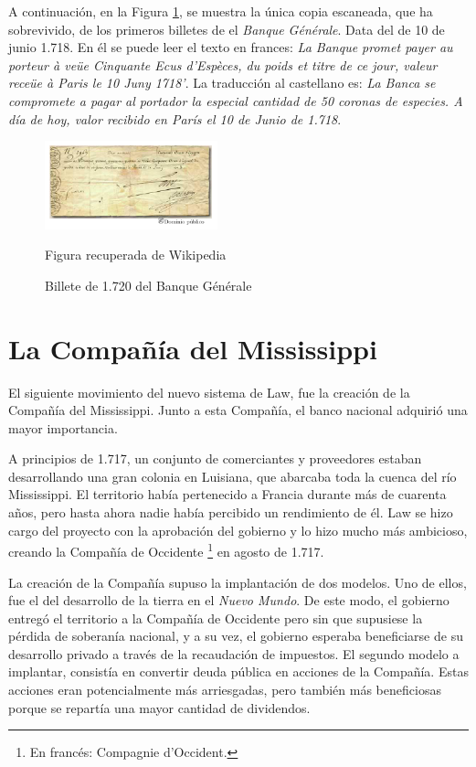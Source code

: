 A continuación, en la Figura \ref{fig:billeteJohn}, se muestra la única copia escaneada, que ha sobrevivido, de los primeros billetes de el \emph{Banque Générale}. Data del de 10 de junio 1.718. En él se puede leer el texto en frances: \emph{La Banque promet payer au porteur à veüe Cinquante Ecus d'Espèces, du poids et titre de ce jour, valeur receüe à Paris le 10 Juny 1718'}. La traducción al castellano es: \emph{La Banca se compromete a pagar al portador la especial cantidad de 50 coronas de especies. A día de hoy, valor recibido en París el 10 de Junio de 1.718}.

\begin{figure}[!h] 
\caption{Billete de 1.720 del Banque Générale} 
\centering \includegraphics[width=50mm]{capitulos/img/billeteJohn} 
\label{fig:billeteJohn} 

	\footnotesize
	Figura recuperada de Wikipedia

\end{figure}

\section{La Compañía del Mississippi}
El siguiente movimiento del nuevo sistema de Law, fue la creación de la Compañía del Mississippi. Junto a esta Compañía, el banco nacional adquirió una mayor importancia.

A principios de 1.717, un conjunto de comerciantes y proveedores estaban desarrollando una gran colonia en Luisiana, que abarcaba toda la cuenca del río Mississippi. El territorio había pertenecido a Francia durante más de cuarenta años, pero hasta ahora nadie había percibido un rendimiento de él. Law se hizo cargo del proyecto con la aprobación del gobierno y lo hizo mucho más ambicioso, creando la Compañía de Occidente	\footnote{En francés: Compagnie d'Occident.} en agosto de 1.717.

La creación de la Compañía supuso la implantación de dos modelos. Uno de ellos, fue el del desarrollo de la tierra en el \emph{Nuevo Mundo}. De este modo, el gobierno entregó el territorio a la Compañía de Occidente pero sin que supusiese la pérdida de soberanía nacional, y a su vez, el gobierno esperaba beneficiarse de su desarrollo privado a través de la recaudación de impuestos. El segundo modelo a implantar, consistía en convertir deuda pública en acciones de la Compañía. Estas acciones eran potencialmente más arriesgadas, pero también más beneficiosas porque se repartía una mayor cantidad de dividendos.


